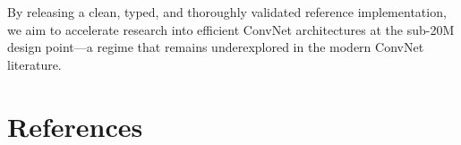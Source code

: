 \documentclass{article}
\begin{document}
By releasing a clean, typed, and thoroughly validated reference
implementation, we aim to accelerate research into efficient ConvNet
architectures at the sub-20M design point---a regime that remains
underexplored in the modern ConvNet literature.


\section*{References}
\end{document}
